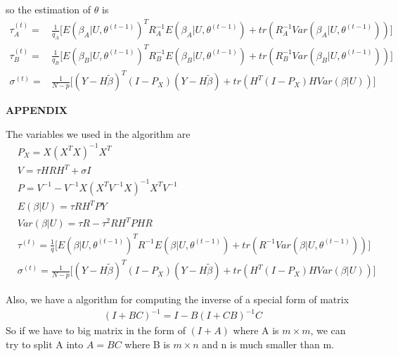 \documentclass[12pt]{article}
\begin{document}
    so the estimation of $\theta$ is
    \begin{align}
    \tau^{(t)}_A=&\frac{1}{q_A}\Big[E(\beta_A|U,\theta^{(t-1)})^TR_A^{-1} E(\beta_A|U,\theta^{(t-1)})+tr(R_A^{-1} Var(\beta_A|U,\theta^{(t-1)}))\Big]\\
    \tau^{(t)}_B=&\frac{1}{q_B}\Big[E(\beta_B|U,\theta^{(t-1)})^TR_B^{-1} E(\beta_B|U,\theta^{(t-1)})+tr(R_B^{-1} Var(\beta_B|U,\theta^{(t-1)}))\Big]\\
    \sigma^{(t)}=&\frac{1}{N-p}\Big[(Y-H\tilde{\beta})^T(I-P_X)(Y-H\tilde{\beta})+tr(H^T(I-P_X)H Var(\beta|U))         \Big]
    \end{align}
    
    
    \begin{center}
        {\bf APPENDIX}
    \end{center}
    The variables we used in the algorithm are
    \begin{align*}
        &P_X=X(X^TX)^{-1}X^T\\
        &V=\tau HRH^T+\sigma I\\
        &P=V^{-1}-V^{-1}X(X^TV^{-1}X)^{-1}X^TV^{-1}\\
        &E(\beta|U)=\tau RH^TPY\\
        &Var(\beta|U)= \tau R-\tau^2RH^TPHR\\
        &\tau^{(t)}=\frac{1}{q}\Big[E(\beta|U,\theta^{(t-1)})^TR^{-1} E(\beta|U,\theta^{(t-1)})+tr(R^{-1}Var(\beta|U,\theta^{(t-1)}))\Big]\\
        &\sigma^{(t)}=\frac{1}{N-p}\Big[(Y-H\tilde{\beta})^T(I-P_X)(Y-H\tilde{\beta})+tr(H^T(I-P_X)H Var(\beta|U))\Big]
    \end{align*}
    
    Also, we have a algorithm for computing the inverse of a special form of matrix
    \begin{align*}
        (I+BC)^{-1}=I-B(I+CB)^{-1}C
    \end{align*}
    So if we have to big matrix in the form of $(I+A)$ where A is $m\times m$, we can try to split A into $A=BC$ where B is $m\times n$ and n is much smaller than m.
\end{document}
